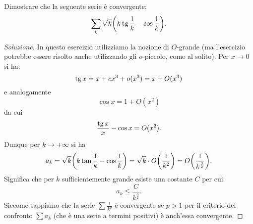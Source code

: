 \begin{exercise}
  Dimostrare che la seguente serie è convergente:
  \[
    \sum_k \sqrt{k} {\left( k\operatorname{tg}{\frac 1 k} - \cos \frac 1 k \right)}.
  \]
\end{exercise}
\begin{proof}[Soluzione]
In questo esercizio utilizziamo la nozione di $O$-grande (ma l'esercizio potrebbe essere risolto anche utilizzando gli $o$-piccolo, come al solito).
Per $x\to 0$ si ha: %
\[
  \operatorname{tg} x = x + c x^3 + o(x^3) = x + O(x^3)
\]
e analogamente
\[
  \cos x = 1 + O(x^2)
\]
da cui
\[
  \frac{\operatorname{tg} x}{x} - \cos x = O(x^2).
\]
Dunque per $k\to +\infty$ si ha
\[
  a_k = \sqrt{k} {\left( k\tan{\frac 1 k} - \cos \frac 1 k \right)}
   = \sqrt{k} \cdot O{\left( \frac 1 {k^2} \right)} = O{\left( \frac 1 {k^{\frac 3 2}} \right)}.
\]
Significa che per $k$ sufficientemente grande esiste una costante $C$
per cui
\[
  a_k \le \frac{C}{k^{\frac 3 2}}.
\]
Siccome sappiamo che la serie $\sum \frac{1}{k^p}$ è convergente
se $p>1$ per il criterio del confronto $\sum a_k$ (che è una serie a termini positivi) è anch'essa convergente.
\end{proof}


